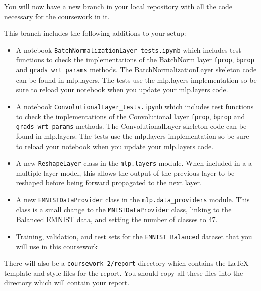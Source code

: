 \documentclass[11pt,]{article}
\begin{document}
You will now have a new branch in your local repository with all the
code necessary for the coursework in it.   

This branch includes the following additions to your setup:

\begin{itemize}
	\itemsep1pt\parskip0pt
	\item
	A notebook \verb+BatchNormalizationLayer_tests.ipynb+ which includes 
	test functions to check the implementations of the BatchNorm layer
	\texttt{fprop}, \texttt{bprop} and \texttt{grads\_wrt\_params}
	methods. The BatchNormalizationLayer skeleton code can be found in mlp.layers. 
	The tests use the mlp.layers implementation so be sure to reload your notebook
	when you update your mlp.layers code.
	\item
	A notebook \verb+ConvolutionalLayer_tests.ipynb+ which includes
	test functions to check the implementations of the Convolutional layer
	\texttt{fprop}, \texttt{bprop} and \texttt{grads\_wrt\_params}
	methods. The ConvolutionalLayer skeleton code can be found in mlp.layers. 
	The tests use the mlp.layers implementation so be sure to reload your notebook
	when you update your mlp.layers code.
	\item
	A new \texttt{ReshapeLayer} class in the \verb+mlp.layers+ module.
	When included in a a multiple layer model, this allows the output of
	the previous layer to be reshaped before being forward propagated to
	the next layer.
	\item
	A new \texttt{EMNISTDataProvider} class in the \verb+mlp.data_providers+ module.
	This class is a small change to the \texttt{MNISTDataProvider} class, linking to the Balanced EMNIST data, and setting the number of classes to 47.
	\item
	Training, validation, and test sets for the \texttt{EMNIST Balanced} dataset that
	you will use in this coursework
\end{itemize}



There will also be a \verb+coursework_2/report+ directory which contains the LaTeX template and style files for the report.  You should copy all these files into the directory which will contain your report.
\end{document}
